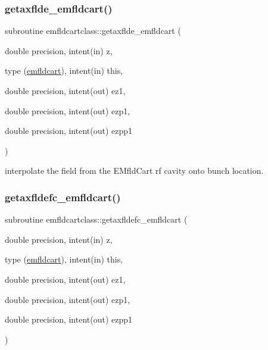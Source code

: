 \mbox{\label{namespaceemfldcartclass_a98959709716076ee10dea98be7a2243c}} 
\subsubsection{\texorpdfstring{getaxflde\_emfldcart()}{getaxflde\_emfldcart()}}
{\footnotesize\ttfamily subroutine emfldcartclass\+::getaxflde\+\_\+emfldcart (\begin{DoxyParamCaption}\item[{double precision, intent(in)}]{z,  }\item[{type (\mbox{\hyperlink{namespaceemfldcartclass_structemfldcartclass_1_1emfldcart}{emfldcart}}), intent(in)}]{this,  }\item[{double precision, intent(out)}]{ez1,  }\item[{double precision, intent(out)}]{ezp1,  }\item[{double precision, intent(out)}]{ezpp1 }\end{DoxyParamCaption})}



interpolate the field from the E\+Mfld\+Cart rf cavity onto bunch location. 

\mbox{\label{namespaceemfldcartclass_abe4d0916e2997f8145abad1eb026ea9d}} 
\subsubsection{\texorpdfstring{getaxfldefc\_emfldcart()}{getaxfldefc\_emfldcart()}}
{\footnotesize\ttfamily subroutine emfldcartclass\+::getaxfldefc\+\_\+emfldcart (\begin{DoxyParamCaption}\item[{double precision, intent(in)}]{z,  }\item[{type (\mbox{\hyperlink{namespaceemfldcartclass_structemfldcartclass_1_1emfldcart}{emfldcart}}), intent(in)}]{this,  }\item[{double precision, intent(out)}]{ez1,  }\item[{double precision, intent(out)}]{ezp1,  }\item[{double precision, intent(out)}]{ezpp1 }\end{DoxyParamCaption})}



